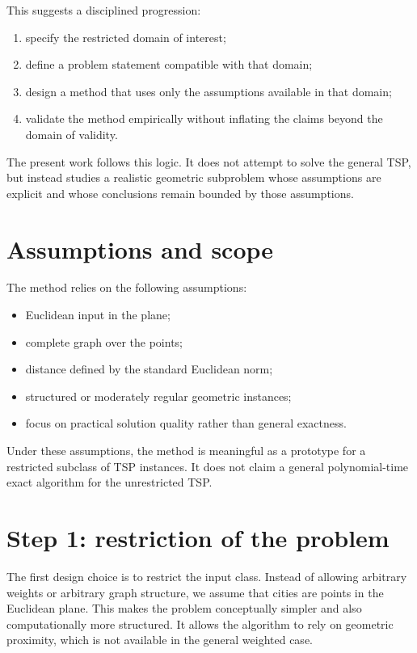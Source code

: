 \documentclass[11pt]{article}
\begin{document}
This suggests a disciplined progression:
\begin{enumerate}
    \item specify the restricted domain of interest;
    \item define a problem statement compatible with that domain;
    \item design a method that uses only the assumptions available in that domain;
    \item validate the method empirically without inflating the claims beyond the domain of validity.
\end{enumerate}

The present work follows this logic. It does not attempt to solve the general TSP, but instead studies a realistic geometric subproblem whose assumptions are explicit and whose conclusions remain bounded by those assumptions.

\section{Assumptions and scope}

The method relies on the following assumptions:
\begin{itemize}
    \item Euclidean input in the plane;
    \item complete graph over the points;
    \item distance defined by the standard Euclidean norm;
    \item structured or moderately regular geometric instances;
    \item focus on practical solution quality rather than general exactness.
\end{itemize}

Under these assumptions, the method is meaningful as a prototype for a restricted subclass of TSP instances. It does not claim a general polynomial-time exact algorithm for the unrestricted TSP.

\section{Step 1: restriction of the problem}

The first design choice is to restrict the input class. Instead of allowing arbitrary weights or arbitrary graph structure, we assume that cities are points in the Euclidean plane. This makes the problem conceptually simpler and also computationally more structured. It allows the algorithm to rely on geometric proximity, which is not available in the general weighted case.
\end{document}
